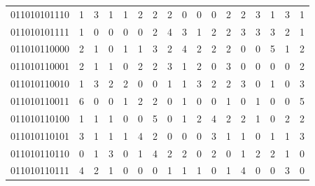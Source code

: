 \documentclass[10pt,a4paper]{article}
\begin{document}
\begin{longtable}{ |c|c|c|c|c|c|c|c|c|c|c|c|c|c|c|c|c| }
    011010101110              & 1                            & 3                                & 1                            & 1                              & 2   & 2   & 2   & 0   & 0   & 0   & 2   & 2   & 3   & 1   & 3   & 1   \\
    011010101111              & 1                            & 0                                & 0                            & 0                              & 0   & 2   & 4   & 3   & 1   & 2   & 2   & 3   & 3   & 3   & 2   & 1   \\
    011010110000              & 2                            & 1                                & 0                            & 1                              & 1   & 3   & 2   & 4   & 2   & 2   & 2   & 0   & 0   & 5   & 1   & 2   \\
    011010110001              & 2                            & 1                                & 1                            & 0                              & 2   & 2   & 3   & 1   & 2   & 0   & 3   & 0   & 0   & 0   & 0   & 2   \\
    011010110010              & 1                            & 3                                & 2                            & 2                              & 0   & 0   & 1   & 1   & 3   & 2   & 2   & 3   & 0   & 1   & 0   & 3   \\
    011010110011              & 6                            & 0                                & 0                            & 1                              & 2   & 2   & 0   & 1   & 0   & 0   & 1   & 0   & 1   & 0   & 0   & 5   \\
    011010110100              & 1                            & 1                                & 1                            & 0                              & 0   & 5   & 0   & 1   & 2   & 4   & 2   & 2   & 1   & 0   & 2   & 2   \\
    011010110101              & 3                            & 1                                & 1                            & 1                              & 4   & 2   & 0   & 0   & 0   & 3   & 1   & 1   & 0   & 1   & 1   & 3   \\
    011010110110              & 0                            & 1                                & 3                            & 0                              & 1   & 4   & 2   & 2   & 0   & 2   & 0   & 1   & 2   & 2   & 1   & 0   \\
    011010110111              & 4                            & 2                                & 1                            & 0                              & 0   & 0   & 1   & 1   & 1   & 0   & 1   & 4   & 0   & 0   & 3   & 0   \\

\end{longtable}
\end{document}
